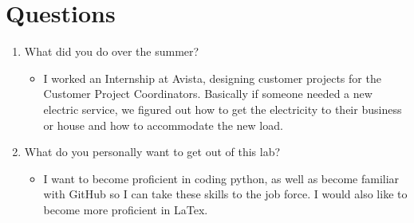 \documentclass[12pt]{report}
\begin{document}
\section*{Questions}

\begin{enumerate}
   \item What did you do over the summer?
   \begin{itemize}
     \item I worked an Internship at Avista, designing customer projects for the Customer Project Coordinators. Basically if someone needed a new electric service, we figured out how to get the electricity to their business or house and how to accommodate the new load.

   \end{itemize}
   \item What do you personally want to get out of this lab?
    \begin{itemize}
     \item I want to become proficient in coding python, as well as become familiar with GitHub so I can take these skills to the job force. I would also like to become more proficient in LaTex.

   \end{itemize}
\end{enumerate}
\end{document}
